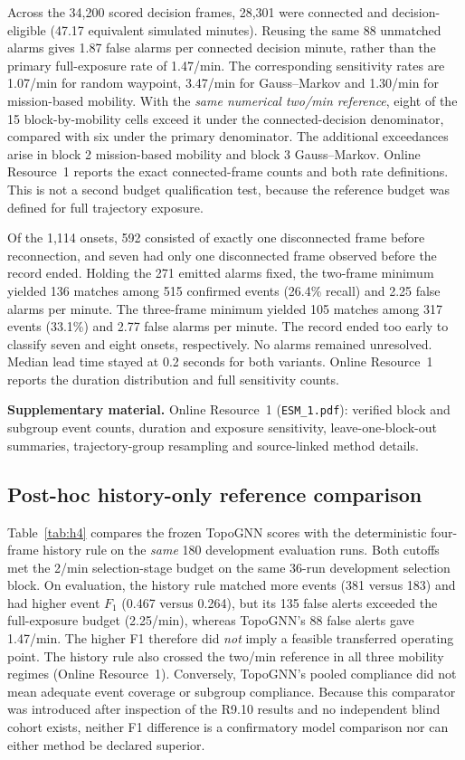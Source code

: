 \documentclass[10pt,a4paper]{article}
\begin{document}
Across the 34,200 scored decision frames, 28,301 were connected and decision-eligible (47.17 equivalent simulated minutes). Reusing the same 88 unmatched alarms gives 1.87 false alarms per connected decision minute, rather than the primary full-exposure rate of 1.47/min. The corresponding sensitivity rates are 1.07/min for random waypoint, 3.47/min for Gauss--Markov and 1.30/min for mission-based mobility. With the \emph{same numerical two/min reference}, eight of the 15 block-by-mobility cells exceed it under the connected-decision denominator, compared with six under the primary denominator. The additional exceedances arise in block 2 mission-based mobility and block 3 Gauss--Markov. Online Resource~1 reports the exact connected-frame counts and both rate definitions. This is not a second budget qualification test, because the reference budget was defined for full trajectory exposure.

Of the 1,114 onsets, 592 consisted of exactly one disconnected frame before reconnection, and seven had only one disconnected frame observed before the record ended. Holding the 271 emitted alarms fixed, the two-frame minimum yielded 136 matches among 515 confirmed events (26.4\% recall) and 2.25 false alarms per minute. The three-frame minimum yielded 105 matches among 317 events (33.1\%) and 2.77 false alarms per minute. The record ended too early to classify seven and eight onsets, respectively. No alarms remained unresolved. Median lead time stayed at 0.2 seconds for both variants. Online Resource~1 reports the duration distribution and full sensitivity counts.\par\noindent\textbf{Supplementary material.} Online Resource~1 (\texttt{ESM\_1.pdf}): verified block and subgroup event counts, duration and exposure sensitivity, leave-one-block-out summaries, trajectory-group resampling and source-linked method details.

\subsection{Post-hoc history-only reference comparison}

Table~\ref{tab:h4} compares the frozen TopoGNN scores with the deterministic four-frame history rule on the \emph{same} 180 development evaluation runs. Both cutoffs met the 2/min selection-stage budget on the same 36-run development selection block. On evaluation, the history rule matched more events (381 versus 183) and had higher event $F_1$ (0.467 versus 0.264), but its 135 false alerts exceeded the full-exposure budget (2.25/min), whereas TopoGNN's 88 false alerts gave 1.47/min. The higher F1 therefore did \emph{not} imply a feasible transferred operating point. The history rule also crossed the two/min reference in all three mobility regimes (Online Resource~1). Conversely, TopoGNN's pooled compliance did not mean adequate event coverage or subgroup compliance. Because this comparator was introduced after inspection of the R9.10 results and no independent blind cohort exists, neither F1 difference is a confirmatory model comparison nor can either method be declared superior.
\end{document}
